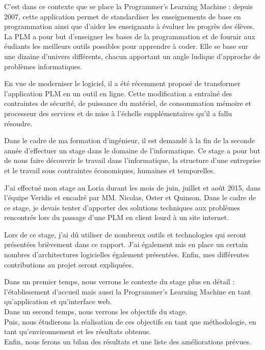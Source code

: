 \documentclass[stage]{tnreport}
\begin{document}
C'est dans ce contexte que se place la Programmer's Learning Machine : depuis 2007, cette application permet de standardiser les enseignements de base en programmation ainsi que d'aider les enseignants à évaluer les progrès des élèves.
La PLM a pour but d'enseigner les bases de la programmation et de fournir aux éudiants les meilleurs outils possibles pour apprendre à coder. Elle se base sur une dizaine d'univers différents, chacun apportant un angle ludique d'approche de problèmes informatiques.

En vue de moderniser le logiciel, il a été récemment proposé de transformer l'application PLM en un outil en ligne. Cette modification a entraîné des contraintes de sécurité, de puissance du matériel, de consommation mémoire et processeur des services et de mise à l'échelle supplémentaires qu'il a fallu résoudre.

Dans le cadre de ma formation d'ingénieur, il est demandé à la fin de la seconde année d'effectuer un stage dans le domaine de l'informatique. Ce stage a pour but de nous faire découvrir le travail dans l'informatique, la structure d'une entreprise et le travail sous contraintes économiques, humaines et temporelles.

J'ai effectué mon stage au Loria durant les mois de juin, juillet et août 2015, dans l'équipe Veridis et encadré par MM. Nicolas, Oster et Quinson. Dans le cadre de ce stage, je devais tenter d'apporter des solutions techniques aux problèmes rencontrés lors du passage d'une PLM en client lourd à un site internet.

Lors de ce stage, j'ai dû utiliser de nombreux outils et technologies qui seront présentées brièvement dans ce rapport. J'ai également mis en place un certain nombres d'architectures logicielles également présentées. Enfin, mes différentes contributions au projet seront expliquées.

Dans un premier temps, nous verrons le contexte du stage plus en détail : l'établissement d'accueil mais aussi la Programmer's Learning Machine en tant qu'application et qu'interface web.\\
Dans un second temps, nous verrons les objectifs du stage.\\
Puis, nous étudierons la réalisation de ces objectifs en tant que méthodologie, en tant qu'environnement et les résultats obtenus.\\
Enfin, nous ferons un bilan des résultats et une liste des améliorations prévues.
\end{document}
